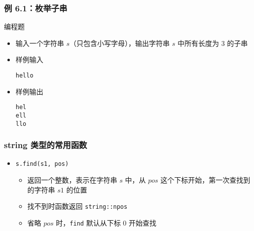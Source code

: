 \begin{frame}[fragile]
    \frametitle{例 6.1：枚举子串}

     {
        

    } {
        \begin{exampleblock}{编程题}
            \begin{itemize}
                \item 输入一个字符串 $s$（只包含小写字母），输出字符串 $s$ 中所有长度为 $3$ 的子串
                    
                \item 样例输入
    
                    \lstinline|hello|
    
                \item 样例输出
                
                    \lstinline|hel|\\
                    \lstinline|ell|\\
                    \lstinline|llo|
    
            \end{itemize}
        \end{exampleblock}
    }

\end{frame}

\begin{frame}[fragile]
    \frametitle{string 类型的常用函数}

    \begin{itemize}
        \item \lstinline|s.find(s1, pos)|
        
        \begin{itemize}
            \item 返回一个整数，表示在字符串 $s$ 中，从 $pos$ 这个下标开始，第一次查找到的字符串 $s1$ 的位置
            \item 找不到时函数返回 \lstinline|string::npos|
            \item 省略 $pos$ 时，\lstinline|find| 默认从下标 $0$ 开始查找
            
            

        \end{itemize}
    \end{itemize}
            
\end{frame}

